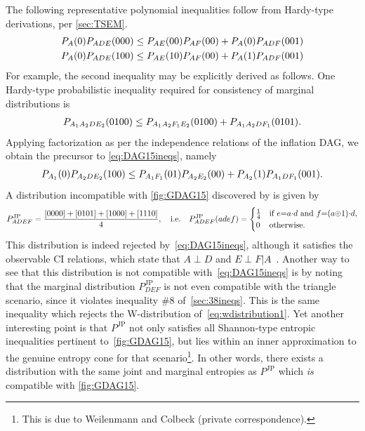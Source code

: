 The following representative polynomial inequalities follow from Hardy-type derivations, per \cref{sec:TSEM}. 
\begin{align}
\p[A]{0} \p[A D E]{0 0 0} \leq {\p[A E]{0 0} \p[A F]{0 0}  + \p[A]{0} \p[A D F]{0 0 1}} \\
\p[A]{0}\p[A D E]{1 0 0} \leq {\p[A E]{1 0} \p[A F]{0 0} + \p[A]{1} \p[A D F]{0 0 1}}
\label{eq:DAG15ineqs}
\end{align}
For example, the second inequality may be explicitly derived as follows. One Hardy-type probabilistic inequality required for consistency of marginal distributions is
\begin{align}\label{eq:hardyforpienaar}
     \pdf[A_1 A_2 D E_2]{0100} \leq \pdf[A_1 A_2 F_1 E_2]{0100} + \pdf[A_1 A_2 D F_1]{0101} .
\end{align}
Applying factorization as per the independence relations of the inflation DAG, we obtain the precursor to \cref{eq:DAG15ineqs}, namely
\begin{align}
 \p[A_1]{0} \p[A_2 D E_2]{100} \leq \p[A_1 F_1]{01} \p[A_2 E_2]{00} + \p[A_2]{1} \p[A_1 D F_1]{001}.    
\end{align}
A distribution incompatible with \cref{fig:GDAG15} discovered by \citet{piannaar2016interesting} is given by
\begin{align}\label{eq:pienaardistro}
P^{\text{JP}}_{A D E F}=\frac{[0000]+[0101]+[1000]+[1110]}{4},\quad\text{i.e.}\quad P^{\text{JP}}_{A D E F}(a d e f)=\begin{cases}\tfrac{1}{4}&\text{if }  e\eql a\cramp{\cdot} d \text{ and } f\eql  (a\cramp{\oplus} 1)\cramp{\cdot} d , \\ 0&\text{otherwise}.\end{cases}
\end{align}
This distribution is indeed rejected by~\cref{eq:DAG15ineqs}, although it satisfies the observable CI relations, which state that $A\perp D$ and $E\perp F | A$~\cite{pusey2014gdag}. Another way to see that this distribution is not compatible with~\cref{eq:DAG15ineqs} is by noting that the marginal distribution $P^{\text{JP}}_{D E F}$ is not even compatible with the triangle scenario, since it violates inequality \#8 of~\cref{sec:38ineqs}. This is the same inequality which rejects the W-distribution of~\cref{eq:wdistribution1}. Yet another interesting point is that $P^{\text{JP}}$ not only satisfies all Shannon-type entropic inequalities pertinent to~\cref{fig:GDAG15}, but lies within an inner approximation to the genuine entropy cone for that scenario\footnote{This is due to Weilenmann and Colbeck (private correspondence).}. In other words, there exists a distribution with the same joint and marginal entropies as  $P^{\text{JP}}$ which \emph{is} compatible with \cref{fig:GDAG15}.

